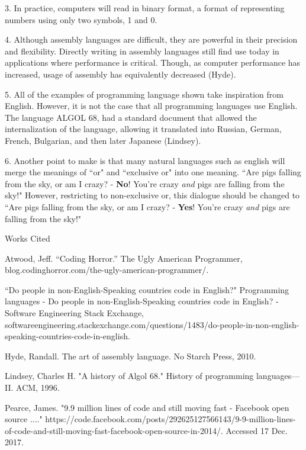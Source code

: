 \documentclass[12pt]{article}
\newcommand{\bibent}{\noindent \hangindent 40pt}
\newenvironment{workscited}{\newpage \begin{center} Works Cited \end{center}}{\newpage }
\begin{document}
\begin{flushleft}
3. In practice, computers will read in binary format, a format of representing
numbers using only two symbols, 1 and 0.

4. Although assembly languages are difficult, they are powerful in their
precision and flexibility. Directly writing in assembly languages
still find use today in applications where performance is critical. Though,
as computer performance has increased, usage of assembly has equivalently
decreased (Hyde).

5. All of the examples of programming language shown take inspiration
from English. However, it is not the case that all programming languages use English.
The language ALGOL 68, had a standard document that allowed the
internalization of the language, allowing it translated into Russian,
German, French, Bulgarian, and then later Japanese (Lindsey).

6. Another point to make is that many natural languages such
as english will merge the meanings
of ``or" and ``exclusive or" into one meaning. ``Are pigs falling from
the sky, or am I crazy? - \textbf{No}! You're crazy \textit{and} pigs are falling
from the sky!" However, restricting to non-exclusive or, this dialogue should
be changed to ``Are pigs falling from
the sky, or am I crazy? - \textbf{Yes}! You're crazy \textit{and} pigs are falling
from the sky!"

\setlength{\parindent}{0.5in}


\begin{workscited}

\bibent
Atwood, Jeff. “Coding Horror.” The Ugly American Programmer, blog.codinghorror.com/the-ugly-american-programmer/. 

\bibent
``Do people in non-English-Speaking countries code in English?" Programming languages - Do people in non-English-Speaking countries code in English? - Software Engineering Stack Exchange, softwareengineering.stackexchange.com/questions/1483/do-people-in-non-english-speaking-countries-code-in-english.


\bibent
Hyde, Randall. The art of assembly language. No Starch Press, 2010.

\bibent
Lindsey, Charles H. "A history of Algol 68." History of programming languages---II. ACM, 1996.

\bibent
Pearce, James. "9.9 million lines of code and still moving fast - Facebook open source ...." https://code.facebook.com/posts/292625127566143/9-9-million-lines-of-code-and-still-moving-fast-facebook-open-source-in-2014/. Accessed 17 Dec. 2017.


\end{workscited}
\end{flushleft}
\end{document}
